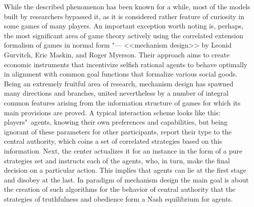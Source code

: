 While the described phenomenon has been known for a while, most of the models built by researchers bypassed it, as it is considered rather feature of curiosity in some games of many players. An important exception worth noting is, perhaps, the most significant area of game theory actively using the correlated extension formalism of games in normal form "--- <<mechanism design>> \cite{Nikolenko} by Leonid Gurvitch, Eric Maskin, and Roger Myerson. Their approach aims to create economic instruments that incentivize selfish rational agents to behave optimally in alignment with common goal functions that formalize various social goods. Being an extremely fruitful area of research, mechanism design has spawned many directions and branches, united nevertheless by a number of integral common features arising from the information structure of games for which its main provisions are proved. A typical interaction scheme looks like this: players"~agents, knowing their own preferences and capabilities, but being ignorant of these parameters for other participants, report their type to the central authority, which coins a set of correlated strategies based on this information. Next, the center actualizes it for an instance in the form of a pure strategies set and instructs each of the agents, who, in turn, make the final decision on a particular action. This implies that agents can lie at the first stage and disobey at the last. In paradigm of mechanism design the main goal is about the creation of such algorithms for the behavior of central authority that the strategies of truthfulness and obedience form a Nash equilibrium for agents. %